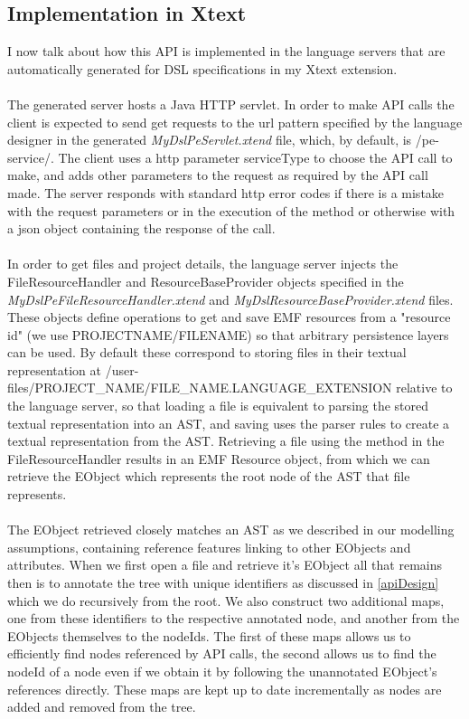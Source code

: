 \documentclass{article}
\begin{document}
\subsection{Implementation in Xtext}
I now talk about how this API is implemented in the language servers that are automatically generated for DSL specifications in my Xtext extension.
\\
\\
The generated server hosts a Java HTTP servlet. In order to make API calls the client is expected to send get requests to the url pattern specified by the language designer in the generated \emph{MyDslPeServlet.xtend} file, which, by default, is /pe-service/. The client uses a http parameter serviceType to choose the API call to make, and adds other parameters to the request as required by the API call made. The server responds with standard http error codes if there is a mistake with the request parameters or in the execution of the method or otherwise with a json object containing the response of the call.
\\
\\
In order to get files and project details, the language server injects the FileResourceHandler and ResourceBaseProvider objects specified in the \emph{MyDslPeFileResourceHandler.xtend} and \emph{MyDslResourceBaseProvider.xtend} files. These objects define operations to get and save EMF resources from a "resource id" (we use PROJECTNAME/FILENAME) so that arbitrary persistence layers can be used. By default these correspond to storing files in their textual representation at /user-files/PROJECT_NAME/FILE_NAME.LANGUAGE_EXTENSION relative to the language server, so that loading a file is equivalent to parsing the stored textual representation into an AST, and saving uses the parser rules to create a textual representation from the AST. Retrieving a file using the method in the FileResourceHandler results in an EMF Resource object, from which we can retrieve the EObject which represents the root node of the AST that file represents.
\\
\\
The EObject retrieved closely matches an AST as we described in our modelling assumptions, containing reference features linking to other EObjects and attributes. When we first open a file and retrieve it's EObject all that remains then is to annotate the tree with unique identifiers as discussed in \ref{apiDesign} which we do recursively from the root. We also construct two additional maps, one from these identifiers to the respective annotated node, and another from the EObjects themselves to the nodeIds. The first of these maps allows us to efficiently find nodes referenced by API calls, the second allows us to find the nodeId of a node even if we obtain it by following the unannotated EObject's references directly. These maps are kept up to date incrementally as nodes are added and removed from the tree.
\end{document}
